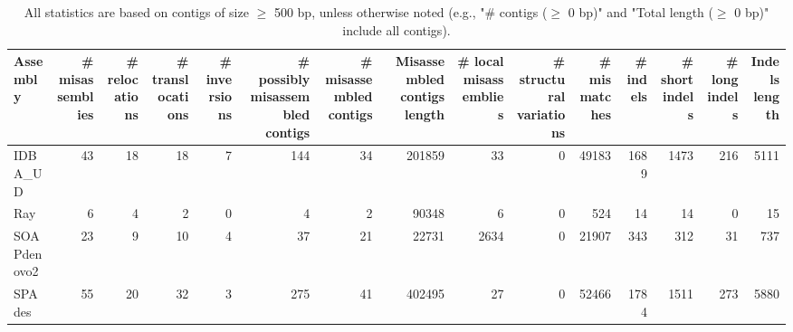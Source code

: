 \documentclass[12pt,a4paper]{article}
\begin{document}
\begin{table}[ht]
\begin{center}
\caption{All statistics are based on contigs of size $\geq$ 500 bp, unless otherwise noted (e.g., "\# contigs ($\geq$ 0 bp)" and "Total length ($\geq$ 0 bp)" include all contigs).}
\begin{tabular}{|l*{14}{|r}|}
\hline
Assembly & \# misassemblies &     \# relocations &     \# translocations &     \# inversions & \# possibly misassembled contigs & \# misassembled contigs & Misassembled contigs length & \# local misassemblies & \# structural variations & \# mismatches & \# indels &     \# short indels &     \# long indels & Indels length \\ \hline
IDBA\_UD & 43 & 18 & 18 & 7 & 144 & 34 & 201859 & 33 & 0 & 49183 & 1689 & 1473 & 216 & 5111 \\ \hline
Ray & 6 & 4 & 2 & 0 & 4 & 2 & 90348 & 6 & 0 & 524 & 14 & 14 & 0 & 15 \\ \hline
SOAPdenovo2 & 23 & 9 & 10 & 4 & 37 & 21 & 22731 & 2634 & 0 & 21907 & 343 & 312 & 31 & 737 \\ \hline
SPAdes & 55 & 20 & 32 & 3 & 275 & 41 & 402495 & 27 & 0 & 52466 & 1784 & 1511 & 273 & 5880 \\ \hline
\end{tabular}
\end{center}
\end{table}
\end{document}
